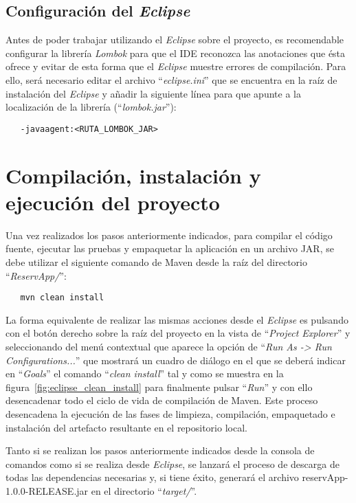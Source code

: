 \subsection{Configuración del \textit{Eclipse}}
Antes de poder trabajar utilizando el \textit{Eclipse} sobre el proyecto, es recomendable configurar la librería \textit{Lombok} para que el IDE reconozca las anotaciones que ésta ofrece y evitar de esta forma que el \textit{Eclipse} muestre errores de compilación. Para ello, será necesario editar el archivo ``\emph{eclipse.ini}'' que se encuentra en la raíz de instalación del \textit{Eclipse} y añadir la siguiente línea para que apunte a la localización de la librería (``\emph{lombok.jar}''):
\begin{verbatim}
   -javaagent:<RUTA_LOMBOK_JAR>
\end{verbatim}

\section{Compilación, instalación y ejecución del proyecto}

Una vez realizados los pasos anteriormente indicados, para compilar el código fuente, ejecutar las pruebas y empaquetar la aplicación en un archivo JAR, se debe utilizar el siguiente comando de Maven desde la raíz del directorio ``\emph{ReservApp/}'':
\begin{verbatim}
   mvn clean install
\end{verbatim}

La forma equivalente de realizar las mismas acciones desde el \textit{Eclipse} es pulsando con el botón derecho sobre la raíz del proyecto en la vista de ``\emph{Project Explorer}'' y seleccionando del menú contextual que aparece la opción de ``\emph{Run As -> Run Configurations...}'' que mostrará un cuadro de diálogo en el que se deberá indicar en ``\emph{Goals}'' el comando ``\emph{clean install}'' tal y como se muestra en la figura~\ref{fig:eclipse_clean_install} para finalmente pulsar ``\emph{Run}'' y con ello desencadenar todo el ciclo de vida de compilación de Maven. Este proceso desencadena la ejecución de las fases de limpieza, compilación, empaquetado e instalación del artefacto resultante en el repositorio local.


Tanto si se realizan los pasos anteriormente indicados desde la consola de comandos como si se realiza desde \textit{Eclipse}, se lanzará el proceso de descarga de todas las dependencias necesarias y, si tiene éxito, generará el archivo reservApp-1.0.0-RELEASE.jar en el directorio ``\emph{target/}''.

